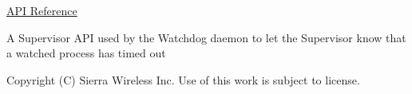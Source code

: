 \hyperlink{le__sup__wdog__interface_8h}{A\+P\+I Reference}

A Supervisor A\+P\+I used by the Watchdog daemon to let the Supervisor know that a watched process has timed out





Copyright (C) Sierra Wireless Inc. Use of this work is subject to license. 